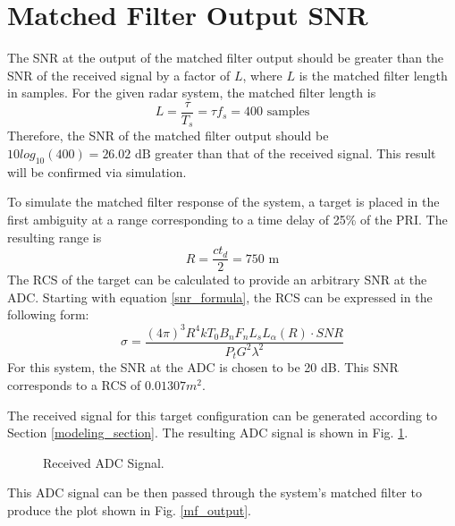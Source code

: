 \documentclass[conference]{IEEEtran}
\begin{document}
\section{Matched Filter Output SNR}
\label{mf_snr_section}
The SNR at the output of the matched filter output should be greater than the SNR of the received signal by a factor of $L$, where $L$ is the matched filter length in samples. For the given radar system, the matched filter length is
\begin{equation}
L = \frac{\tau}{T_s} = \tau f_s = 400 \text{ samples}
\end{equation}
Therefore, the SNR of the matched filter output should be $10log_{10}(400)=26.02 \text{ dB}$ greater than that of the received signal. This result will be confirmed via simulation.
\par
To simulate the matched filter response of the system, a target is placed in the first ambiguity at a range corresponding to a time delay of 25\% of the PRI. The resulting range is
\begin{equation}
R = \frac{ct_d}{2} = 750 \text{ m}
\label{tgt1 range}
\end{equation}
The RCS of the target can be calculated to provide an arbitrary SNR at the ADC. Starting with equation \eqref{snr_formula}, the RCS can be expressed in the following form:
\begin{equation}
\sigma = \frac{(4\pi)^3 R^4 k T_0 B_n F_n L_s L_\alpha(R)\cdot SNR}{P_t G^2 \lambda^2}
\label{rcs_formula}
\end{equation}
For this system, the SNR at the ADC is chosen to be 20 dB. This SNR corresponds to a RCS of $0.01307m^2$.
\par
The received signal for this target configuration can be generated according to Section \ref{modeling_section}. The resulting ADC signal is shown in Fig. \ref{adc_sig}.
\begin{figure}[H]
\centerline{}
\caption{Received ADC Signal.}
\label{adc_sig}
\end{figure}
\noindent
This ADC signal can be then passed through the system's matched filter to produce the plot shown in Fig. \ref{mf_output}.
\end{document}
